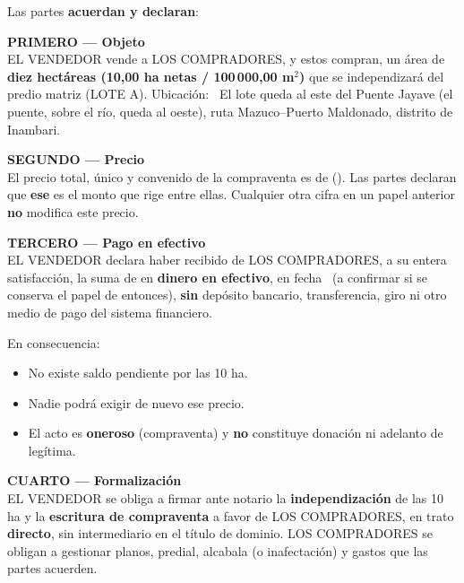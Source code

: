 \documentclass[12pt,a4paper]{article}
\begin{document}
\vspace{0.7em}
\noindent Las partes \textbf{acuerdan y declaran}:

\vspace{0.45em}
\noindent\textbf{PRIMERO --- Objeto}\\[0.15em]
EL VENDEDOR vende a LOS COMPRADORES, y estos compran, un área de \textbf{diez hectáreas (10,00 ha netas / 100\,000,00 m$^2$)} que se independizará del predio matriz (LOTE A). Ubicación: \CriterioRecorte\ El lote queda al este del Puente Jayave (el puente, sobre el río, queda al oeste), ruta Mazuco--Puerto Maldonado, distrito de Inambari.

\vspace{0.45em}
\noindent\textbf{SEGUNDO --- Precio}\\[0.15em]
El precio total, único y convenido de la compraventa es de \textbf{\MontoPago} (\textbf{\MontoPagoLetras}). Las partes declaran que \textbf{ese} es el monto que rige entre ellas. Cualquier otra cifra en un papel anterior \textbf{no} modifica este precio.

\vspace{0.45em}
\noindent\textbf{TERCERO --- Pago en efectivo}\\[0.15em]
EL VENDEDOR declara haber recibido de LOS COMPRADORES, a su entera satisfacción, la suma de \textbf{\MontoPago} en \textbf{dinero en efectivo}, en fecha \FechaPago\ (a confirmar si se conserva el papel de entonces), \textbf{sin} depósito bancario, transferencia, giro ni otro medio de pago del sistema financiero.

\vspace{0.25em}
\noindent En consecuencia:
\begin{itemize}[leftmargin=1.2cm,itemsep=0.25em]
\item No existe saldo pendiente por las 10 ha.
\item Nadie podrá exigir de nuevo ese precio.
\item El acto es \textbf{oneroso} (compraventa) y \textbf{no} constituye donación ni adelanto de legítima.
\end{itemize}

\vspace{0.45em}
\noindent\textbf{CUARTO --- Formalización}\\[0.15em]
EL VENDEDOR se obliga a firmar ante notario la \textbf{independización} de las 10 ha y la \textbf{escritura de compraventa} a favor de LOS COMPRADORES, en trato \textbf{directo}, sin intermediario en el título de dominio. LOS COMPRADORES se obligan a gestionar planos, predial, alcabala (o inafectación) y gastos que las partes acuerden.
\end{document}
